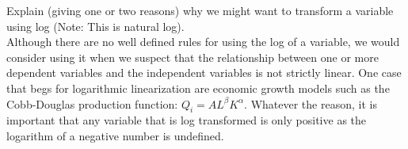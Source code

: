 \item Explain (giving one or two reasons) why we might want to transform a variable using log (Note: This is natural log). \\

Although there are no well defined rules for using the log of a variable, we would consider using it when we suspect that the relationship between one or more dependent variables and the independent variables is not strictly linear.  One case that begs for logarithmic linearization are economic growth models such as the Cobb-Douglas production function: $ Q_i = A L^{\beta} K^{\alpha}$.  Whatever the reason, it is important that any variable that is log transformed is only positive as the logarithm of a negative number is undefined. \\
